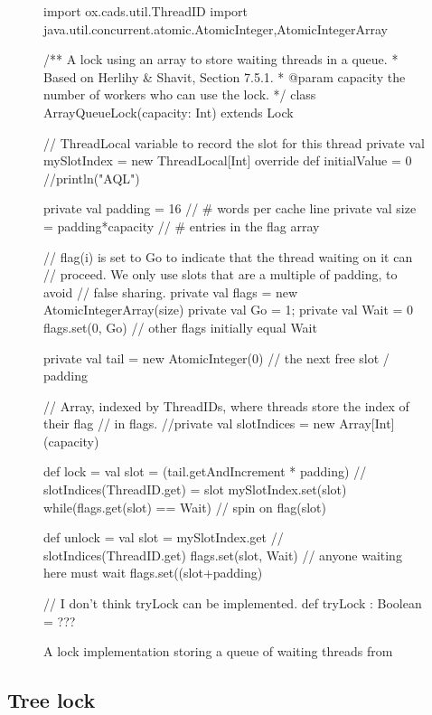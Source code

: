 \begin{figure}
  \begin{scala}
    import ox.cads.util.ThreadID
    import java.util.concurrent.atomic.{AtomicInteger,AtomicIntegerArray}

    /** A lock using an array to store waiting threads in a queue.
      * Based on Herlihy & Shavit, Section 7.5.1.
      * @param capacity the number of workers who can use the lock. */ 
    class ArrayQueueLock(capacity: Int) extends Lock{
      // ThreadLocal variable to record the slot for this thread
      private val mySlotIndex = 
        new ThreadLocal[Int]{ override def initialValue = 0 }
      //println("AQL")

      private val padding = 16 // # words per cache line 
      private val size = padding*capacity // # entries in the flag array

      // flag(i) is set to Go to indicate that the thread waiting on it can
      // proceed.  We only use slots that are a multiple of padding, to avoid
      // false sharing.
      private val flags = new AtomicIntegerArray(size)
      private val Go = 1; private val Wait = 0
      flags.set(0, Go) // other flags initially equal Wait

      private val tail = new AtomicInteger(0) // the next free slot / padding

      // Array, indexed by ThreadIDs, where threads store the index of their flag
      // in flags.
      //private val slotIndices = new Array[Int](capacity)

      def lock = {
        val slot = (tail.getAndIncrement * padding) %
        // slotIndices(ThreadID.get) = slot
        mySlotIndex.set(slot)
        while(flags.get(slot) == Wait){ } // spin on flag(slot)
      }

      def unlock = {
        val slot = mySlotIndex.get // slotIndices(ThreadID.get)
        flags.set(slot, Wait) // anyone waiting here must wait
        flags.set((slot+padding)%
      }

      // I don't think tryLock can be implemented. 
      def tryLock : Boolean = ???
    }
  \end{scala}
  \caption{A lock implementation storing a queue of waiting threads from \cite{TAoMP} \label{fig:QueueScala}}
\end{figure}

\subsection{Tree lock}